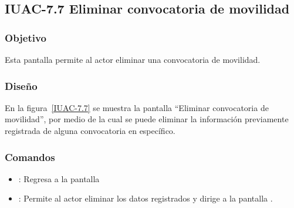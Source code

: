 \subsection{IUAC-7.7 Eliminar convocatoria de movilidad}

\subsubsection{Objetivo}

Esta pantalla permite al actor  eliminar una convocatoria de movilidad.

\subsubsection{Diseño}

En la figura~\ref{IUAC-7.7} se muestra la pantalla ``Eliminar convocatoria de movilidad'', por medio de la cual se puede eliminar la información previamente registrada de alguna convocatoria en específico. \\


\subsubsection{Comandos}
\begin{itemize}
	\item {}: Regresa a la pantalla 
	\item {}: Permite al actor eliminar los datos registrados y dirige a la pantalla .
\end{itemize}